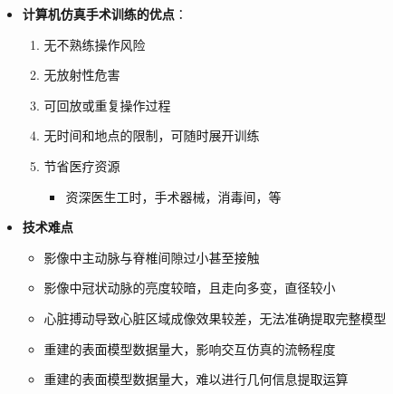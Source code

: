 \begin{frame}
\begin{itemize}
  \item \textbf{计算机仿真手术训练的优点}：
  \begin{enumerate}
     \item 无不熟练操作风险
     \item 无放射性危害
     \item 可回放或重复操作过程
     \item 无时间和地点的限制，可随时展开训练
     \item 节省医疗资源
	\begin{itemize}
	\item 资深医生工时，手术器械，消毒间，等
	\end{itemize}
  \end{enumerate}
\end{itemize}
\end{frame}

\begin{frame}
\begin{itemize}
\item \textbf{技术难点}
\begin{itemize}
\pause \item 影像中主动脉与脊椎间隙过小甚至接触
\pause \item 影像中冠状动脉的亮度较暗，且走向多变，直径较小
\pause \item 心脏搏动导致心脏区域成像效果较差，无法准确提取完整模型
\pause \item 重建的表面模型数据量大，影响交互仿真的流畅程度
\pause \item 重建的表面模型数据量大，难以进行几何信息提取运算
\end{itemize}
\end{itemize}
\end{frame}

